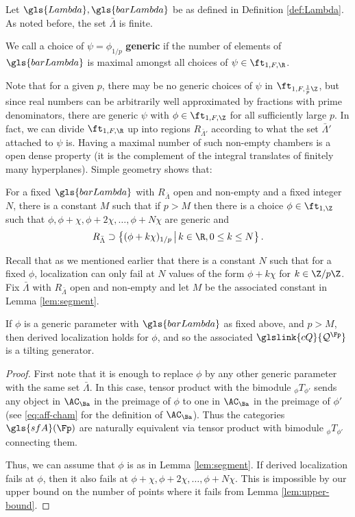 Let $\gls{Lambda},\gls{barLambda}$ be as defined in Definition \ref{def:Lambda}.  As noted before, the set $\bar{\Lambda}$ is finite.
\begin{definition}
 We call a choice of $\psi=\phi_{1/p}$ {\bf generic} if the number of elements of $ \gls{barLambda}$ is maximal amongst all choices of $\psi\in \ft_{1,F,\R}$.  
\end{definition}
Note that for a given $p$, there may be no generic choices of $\psi$ in $\ft_{1,F,\frac{1}{p}\Z}$, but since real numbers can be arbitrarily well approximated by fractions with prime denominators, there are generic $\psi$ with $\phi\in \ft_{1,F,\Z}$ for all sufficiently large $p$.   In fact, we can divide $\ft_{1,F,\R}$ up into regions $R_{\bar{\Lambda}'}$ according to  what the set $\bar \Lambda'$ attached to $\psi$ is.  Having a maximal number of such non-empty chambers is a open dense property (it is the complement of the integral translates of finitely many hyperplanes).  Simple geometry shows that:
\begin{lemma}\label{lem:segment}
For a fixed $\gls{barLambda}$ with $R_{\bar{\Lambda}}$ open and non-empty and a fixed integer $N$, there is a constant $M$ such that if $p>M$ then there is a choice $\phi\in \ft_{1,\Z}$ such that $\phi,\phi+\chi,\phi+2\chi,\dots, \phi+N\chi$ are generic and \[R_{\bar{\Lambda}}\supset \left\{(\phi+k\chi)_{1/p}\,\big| \,k\in \R, 0\leq k\leq N\right\}.\]
\end{lemma}
Recall that as we mentioned earlier that there is a constant $N$ such that for a fixed $\phi$, localization can only fail at $N$ values of the form $\phi+k\chi$ for $k\in \Z/p\Z$.  Fix $\bar{\Lambda}$ with $R_{\bar{\Lambda}}$ open and non-empty and let $M$ be the associated constant in Lemma \ref{lem:segment}.
\begin{theorem}\label{thm:asymptotic-derived}
  If $\phi$ is a generic parameter with $\gls{barLambda}$ as fixed above, and $p>M$, then derived localization holds for $\phi$, and so the associated $\glslink{cQ}{\mathcal{Q}^{\Fp}}$ is a tilting generator.  
\end{theorem}
\begin{proof}
  First note that it is enough to replace $\phi$ by any other generic parameter with the same set $\bar{\Lambda}$. In this case,  tensor product with the bimodule ${}_{\phi}T_{\phi'}$  sends any object in $\AC_{\Ba}$ in the preimage of $\phi$ to one in $\AC_{\Ba}$ in the preimage of $\phi'$ (see \eqref{eq:aff-cham} for the definition of $\AC_{\Ba}$).  Thus the categories $\gls{sfA}(\Fp)$ are naturally equivalent via tensor product with bimodule ${}_{\phi}T_{\phi'}$ connecting them. 
  
  Thus, we can assume that $\phi$ is as in Lemma \ref{lem:segment}.  If derived localization fails at $\phi$, then it also fails at $\phi+\chi,\phi+2\chi,\dots, \phi+N\chi$.  This is impossible by our upper bound on the number of points where it fails from Lemma \ref{lem:upper-bound}.
\end{proof}

